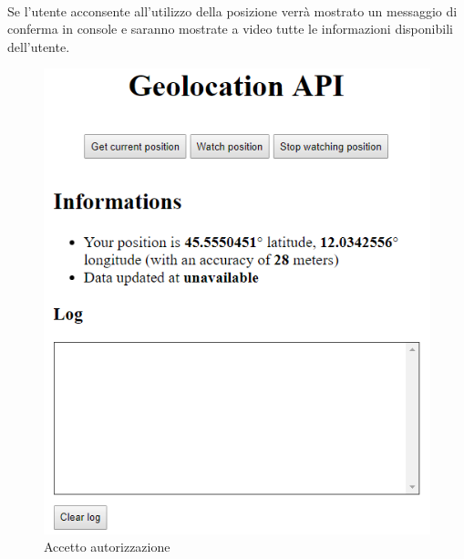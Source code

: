\documentclass[11pt ,a4paper , twoside , openright ]{book}
\begin{document}
	\pagebreak
	\\
	Se l'utente acconsente all'utilizzo della posizione verrà mostrato un messaggio di conferma in console e saranno mostrate a video tutte le informazioni disponibili dell'utente.
	\begin{figure}[h]
		\centering
		\includegraphics[width=0.4\linewidth]{geo4}
		\caption{Accetto autorizzazione}
		\label{fig: Accetto autorizzazione}
	\end{figure}
	\\
	
	
\end{document}
